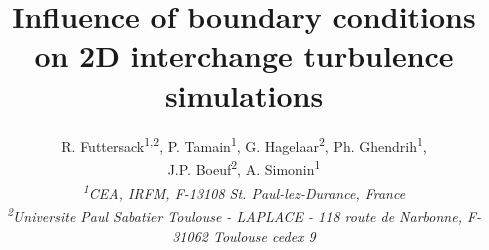 \documentclass[12pt]{article}
\begin{document}
\newcommand{\vecMath}[1]{\mathbf{#1}}

\title{Influence of boundary conditions on 2D interchange turbulence simulations}
\author{\small{R. Futtersack\textsuperscript{1,2},
		P. Tamain\textsuperscript{1}, 
		G. Hagelaar\textsuperscript{2}, 
		Ph. Ghendrih\textsuperscript{1},}\\ 
		\small{J.P. Boeuf\textsuperscript{2}, 
		A. Simonin\textsuperscript{1}}\\
		\scriptsize{\textit{\textsuperscript{1}CEA, IRFM, F-13108 St. Paul-lez-Durance, France}}\\
		\scriptsize{\textit{\textsuperscript{2}Universite Paul Sabatier Toulouse - LAPLACE - 118 route de Narbonne, F-31062 Toulouse cedex 9}}}
\date{}
\maketitle

\thispagestyle{empty}
\end{document}
